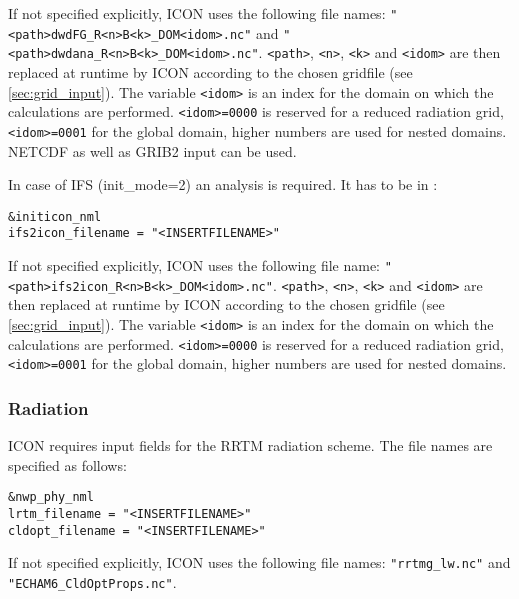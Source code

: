 If not specified explicitly, ICON uses the following file names: \newline 
\verb+"<path>dwdFG_R<n>B<k>_DOM<idom>.nc"+ and \newline
\verb+"<path>dwdana_R<n>B<k>_DOM<idom>.nc"+. \newline
\verb+<path>+, \verb+<n>+, \verb+<k>+ and \verb+<idom>+ are then replaced at runtime by ICON according to the chosen gridfile (see \ref{sec:grid_input}). The variable \verb+<idom>+ is an index for the domain on which the calculations are performed. \verb+<idom>=0000+ is reserved for a reduced radiation grid, \verb+<idom>=0001+ for the global domain, higher numbers are used for nested domains. NETCDF as well as GRIB2 input can be used.

In case of IFS (init\_mode=2) an analysis is required. It has to be in \netcdf: 
\begin{verbatim}
&initicon_nml
ifs2icon_filename = "<INSERTFILENAME>"
\end{verbatim}

If not specified explicitly, ICON uses the following file name: \newline 
\verb+"<path>ifs2icon_R<n>B<k>_DOM<idom>.nc"+. \newline
\verb+<path>+, \verb+<n>+, \verb+<k>+ and \verb+<idom>+ are then replaced at runtime by ICON according to the chosen gridfile (see \ref{sec:grid_input}). The variable \verb+<idom>+ is an index for the domain on which the calculations are performed. \verb+<idom>=0000+ is reserved for a reduced radiation grid, \verb+<idom>=0001+ for the global domain, higher numbers are used for nested domains.

\subsubsection{Radiation}\label{InputReal:Rad}

ICON requires input fields for the RRTM radiation scheme. The file names are specified as follows:

\begin{verbatim}
&nwp_phy_nml
lrtm_filename = "<INSERTFILENAME>" 
cldopt_filename = "<INSERTFILENAME>"
\end{verbatim}

If not specified explicitly, ICON uses the following file names: \newline 
\verb+"rrtmg_lw.nc"+ and \newline
\verb+"ECHAM6_CldOptProps.nc"+.

